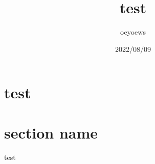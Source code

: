 \documentclass{article}
\title{test}
\author{oeyoews}
\date{2022/08/09}
\begin{document}
\maketitle


\section{test}%
\label{sec:test}

\section{section name}%
\label{sec:section name}
test
\end{document}
